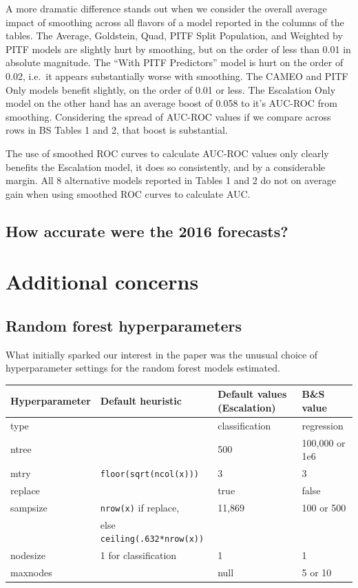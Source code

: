 \documentclass[]{article}
\begin{document}
A more dramatic difference stands out when we consider the overall
average impact of smoothing across all flavors of a model reported in
the columns of the tables. The Average, Goldstein, Quad, PITF Split
Population, and Weighted by PITF models are slightly hurt by smoothing,
but on the order of less than 0.01 in absolute magnitude. The ``With
PITF Predictors'' model is hurt on the order of 0.02, i.e.~it appears
substantially worse with smoothing. The CAMEO and PITF Only models
benefit slightly, on the order of 0.01 or less. The Escalation Only
model on the other hand has an average boost of 0.058 to it's AUC-ROC
from smoothing. Considering the spread of AUC-ROC values if we compare
across rows in BS Tables 1 and 2, that boost is substantial.

The use of smoothed ROC curves to calculate AUC-ROC values only clearly
benefits the Escalation model, it does so consistently, and by a
considerable margin. All 8 alternative models reported in Tables 1 and 2
do not on average gain when using smoothed ROC curves to calculate AUC.

\hypertarget{how-accurate-were-the-2016-forecasts}{%
\subsection{How accurate were the 2016
forecasts?}\label{how-accurate-were-the-2016-forecasts}}

\hypertarget{additional-concerns}{%
\section{Additional concerns}\label{additional-concerns}}

\hypertarget{random-forest-hyperparameters}{%
\subsection{Random forest
hyperparameters}\label{random-forest-hyperparameters}}

What initially sparked our interest in the paper was the unusual choice
of hyperparameter settings for the random forest models estimated.

\begin{longtable}[]{@{}llll@{}}
\toprule
Hyperparameter & Default heuristic & Default values (Escalation) & B\&S
value\tabularnewline
\midrule
\endhead
type & & classification & regression\tabularnewline
ntree & & 500 & 100,000 or 1e6\tabularnewline
mtry & \texttt{floor(sqrt(ncol(x)))} & 3 & 3\tabularnewline
replace & & true & false\tabularnewline
sampsize & \texttt{nrow(x)} if replace, & 11,869 & 100 or
500\tabularnewline
& else \texttt{ceiling(.632*nrow(x))} & &\tabularnewline
nodesize & 1 for classification & 1 & 1\tabularnewline
maxnodes & & null & 5 or 10\tabularnewline
\bottomrule
\end{longtable}
\end{document}
